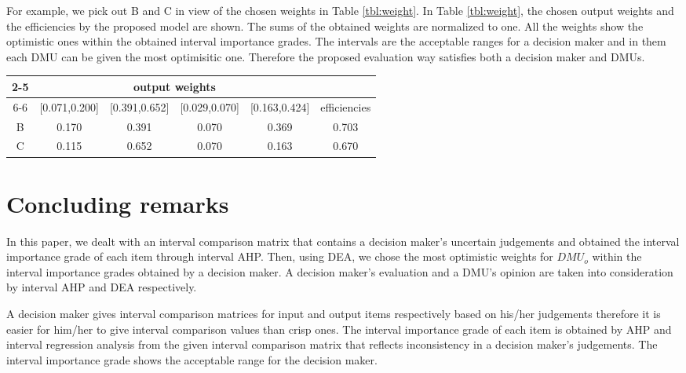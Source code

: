 For example, we pick out B and C in view of the chosen weights in Table \ref{tbl:weight}. 
In Table \ref{tbl:weight}, the chosen output weights and the efficiencies by the proposed model are shown. 
The sums of the obtained weights are normalized to one. 
All the weights show the optimistic ones within the obtained interval importance grades.
The intervals are the acceptable ranges for a decision maker and in them each DMU can be given the most optimisitic one. 
Therefore the proposed evaluation way satisfies both a decision maker and DMUs. 
\begin{table*}[t]
\begin{center}
\begin{tabular}{|c|cccc|c|} \cline{2-5}
\multicolumn{1}{c|}{} &  \multicolumn{4}{c|}{output weights} & \multicolumn{1}{c}{} \\\cline{6-6}
\multicolumn{1}{c|}{}  &  [0.071,0.200]& [0.391,0.652]& [0.029,0.070]& [0.163,0.424] & efficiencies \\\hline
B  &  0.170 & 0.391 & 0.070 & 0.369 & 0.703\\\hline
C  &  0.115 & 0.652 & 0.070 & 0.163 & 0.670\\\hline
\end{tabular}
\end{center}
\caption{Chosen output weights for B and C }
\label{tbl:weight}
\end{table*}

\section{Concluding remarks}

In this  paper, we dealt with an interval comparison matrix that contains a decision maker's uncertain judgements and obtained the interval importance grade of each item through interval AHP. 
Then, using DEA, we chose the most optimistic weights for $DMU_o$ within the interval importance grades obtained by a decision maker. 
A decision maker's evaluation and a DMU's opinion are taken into consideration by interval AHP and DEA respectively.

A decision maker gives interval comparison matrices for input and output items 
respectively based on his/her judgements therefore it is easier for him/her to give interval comparison values than crisp ones. 
The interval importance grade of each item is obtained by AHP and interval regression analysis from the given interval comparison matrix that reflects inconsistency in a decision maker's judgements. 
The interval importance grade shows the acceptable range for the decision maker. 

